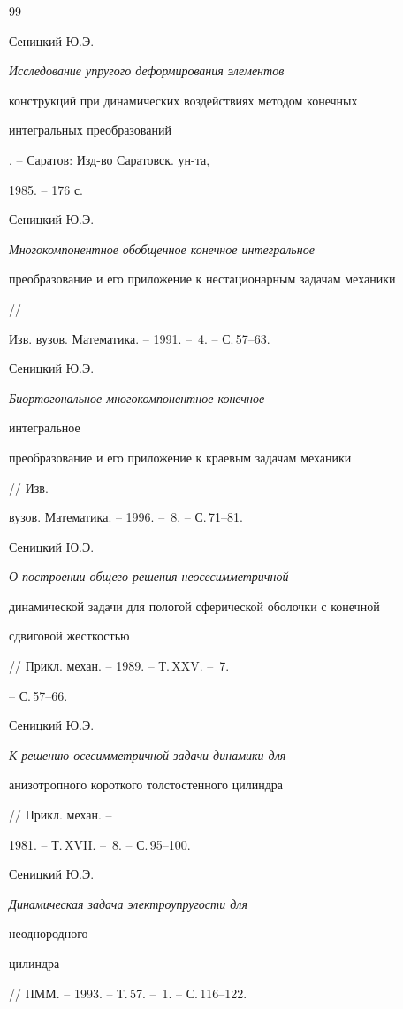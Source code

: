 \begin{thebibliography}{99} 


 




Сеницкий Ю.Э. {\em Исследование упругого деформирования элементов 


конструкций при динамических воздействиях методом конечных 


интегральных преобразований}. -- Саратов: Изд-во Саратовск. ун-та, 


1985. -- 176 с. 




Сеницкий Ю.Э. {\em Многокомпонентное обобщенное конечное интегральное 


преобразование и его приложение к нестационарным задачам механики} // 


Изв. вузов. Математика. -- 1991. -- \No\,4. -- С.\,57--63. 




Сеницкий Ю.Э. {\em Биортогональное многокомпонентное конечное 


интегральное 


преобразование и его приложение к краевым задачам механики} // Изв. 


вузов. Математика. -- 1996. -- \No\,8. -- С.\,71--81. 




Сеницкий Ю.Э. {\em О построении общего решения неосесимметричной 


динамической задачи для пологой сферической оболочки с конечной 


сдвиговой жесткостью} // Прикл. механ. -- 1989. -- Т.\,XXV. -- \No\,7. 


-- С.\,57--66. 




Сеницкий Ю.Э. {\em К решению осесимметричной задачи динамики для 


анизотропного короткого толстостенного цилиндра} // Прикл. механ. -- 


1981. -- Т.\,XVII. -- \No\,8. -- С.\,95--100. 




Сеницкий Ю.Э. {\em Динамическая задача электроупругости для 


неоднородного 


цилиндра} // ПММ. -- 1993. -- Т.\,57. -- \No\,1. -- С.\,116--122. 





\end{thebibliography}
